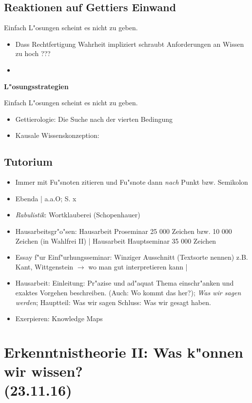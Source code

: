 \documentclass[emulatestandardclasses]{scrartcl}
\begin{document}
\subsection{Reaktionen auf Gettiers Einwand}

Einfach L"osungen scheint es nicht zu geben.
\begin{itemize}
  \item Dass Rechtfertigung Wahrheit impliziert schraubt Anforderungen an Wissen zu hoch ???
  \item 
\end{itemize}

\textbf{L"osungsstrategien}

Einfach L"osungen scheint es nicht zu geben.
\begin{itemize}
  \item Gettierologie: Die Suche nach der vierten Bedingung
  \item Kausale Wissenskonzeption: 
\end{itemize}


\subsection{Tutorium}

\begin{itemize}
  \item Immer mit Fu"snoten zitieren und Fu"snote dann \emph{nach} Punkt bzw. Semikolon
  \item Ebenda | a.a.O; S. x
  \item \emph{Rabulistik}: Wortklauberei (Schopenhauer)
  \item Hausarbeitsgr"o"sen: Hausarbeit Proseminar 25 000 Zeichen bzw. 10 000 Zeichen (in Wahlfrei II) | Hausarbeit Hauptseminar 35 000 Zeichen
  \item Essay f"ur Einf"urhungsseminar: Winziger Ausschnitt (Textsorte nennen) z.B. Kant, Wittgenstein $\rightarrow$ wo man gut interpretieren kann |
  \item Hausarbeit: Einleitung: Pr"azise und ad"aquat Thema einschr"anken und exaktes Vorgehen beschreiben. (Auch: Wo kommt das her?); \emph{Was wir sagen werden}; Hauptteil: Was wir sagen Schluss: Was wir gesagt haben.
  \item Exerpieren: Knowledge Maps
\end{itemize}


\section{Erkenntnistheorie II: Was k"onnen wir wissen?\\(23.11.16)}
\end{document}

